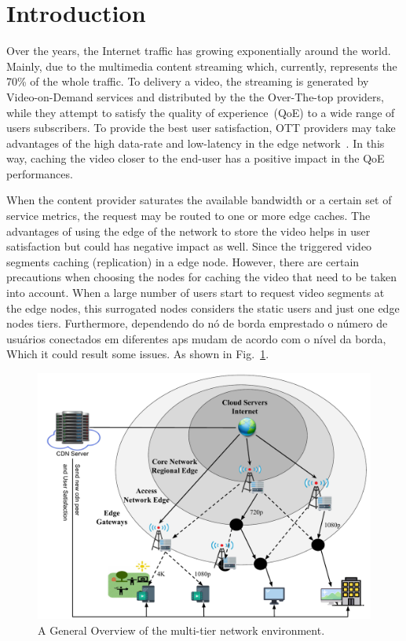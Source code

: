 \section{Introduction}
\label{sec:introduction}


Over the years, the Internet traffic has growing exponentially around the world. Mainly, due to the multimedia content streaming which, currently, represents the 70\% of the whole traffic. To delivery a video, the streaming is generated by Video-on-Demand services and distributed by the the Over-The-top providers, while they attempt to satisfy the quality of experience~(QoE) to a wide range of users subscribers. To provide the best user satisfaction, OTT providers may take advantages of the high data-rate and low-latency in the edge network~\cite{DBLP:CoRR:2021}. In this way, caching the video closer to the end-user has a positive impact in the QoE performances.


When the content provider saturates the available bandwidth or a certain set of service metrics, the request may be routed to one or more edge caches. 
The advantages of using the edge of the network to store the video helps in user satisfaction but could has negative impact as well. Since the triggered video segments caching (replication) in a edge node.
However, there are certain precautions when choosing the nodes for caching the video that need to be taken into account. 
When a large number of users start to request video segments at the edge nodes, this surrogated nodes considers the static users and just one edge nodes tiers. Furthermore, dependendo do nó de borda emprestado o número de usuários conectados em diferentes aps mudam de acordo com o nível da borda, 
Which it could result some issues. 
As shown in Fig.~\ref{fig:multi-tier-network}.

\begin{figure}
    \centering
    \includegraphics[width=0.9\linewidth]{images/arch-video-content.pdf}
    \caption{A General Overview of the multi-tier network environment.}
    \label{fig:multi-tier-network}
\end{figure}

